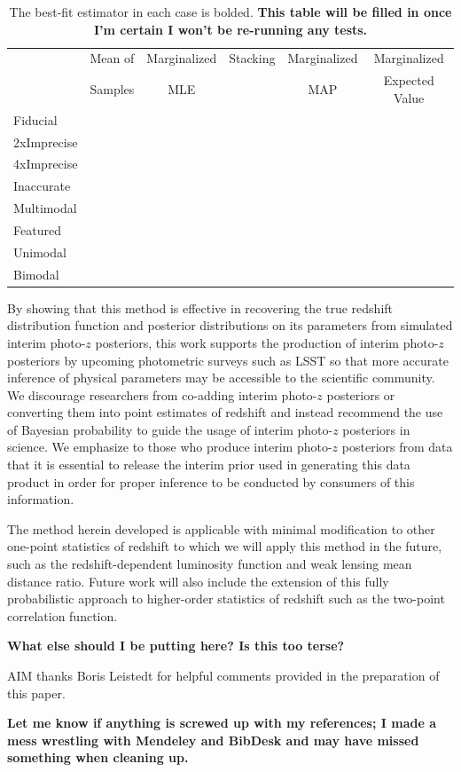\documentclass[preprint]{aastex}
\begin{document}
\begin{table}
\begin{tabular}{lccccc}
& Mean of & Marginalized & Stacking & Marginalized & Marginalized\\
& Samples & MLE & & MAP & Expected Value\\
Fiducial &&&&&\\
2xImprecise &&&&&\\
4xImprecise &&&&&\\
Inaccurate &&&&&\\
Multimodal &&&&&\\
Featured &&&&&\\
Unimodal &&&&&\\
Bimodal &&&&&
\end{tabular}
\caption{The best-fit estimator in each case is bolded.  \textbf{This table 
will be filled in once I'm certain I won't be re-running any tests.}}
\label{tab:kld}
\end{table}

By showing that this method is effective in recovering the true redshift 
distribution function and posterior distributions on its parameters from 
simulated interim photo-$z$ posteriors, this work supports the production of 
interim photo-$z$ posteriors by upcoming photometric surveys such as LSST so 
that more accurate inference of physical parameters may be accessible to the 
scientific community.  We discourage researchers from co-adding interim 
photo-$z$ posteriors or converting them into point estimates of redshift and 
instead recommend the use of Bayesian probability to guide the usage of interim 
photo-$z$ posteriors in science.  We emphasize to those who produce interim 
photo-$z$ posteriors from data that it is essential to release the interim 
prior used in generating this data product in order for proper inference to be 
conducted by consumers of this information.

The method herein developed is applicable with minimal modification to other 
one-point statistics of redshift to which we will apply this method in the 
future, such as the redshift-dependent luminosity function and weak lensing 
mean distance ratio.  Future work will also include the extension of this fully 
probabilistic approach to higher-order statistics of redshift such as the 
two-point correlation function.

\textbf{What else should I be putting here?  Is this too terse?}


\begin{acknowledgements}
AIM thanks Boris Leistedt for helpful comments provided in the preparation of 
this paper.
\end{acknowledgements}

\textbf{Let me know if anything is screwed up with my references; I made a mess 
wrestling with Mendeley and BibDesk and may have missed something when cleaning 
up.}


\end{document}
